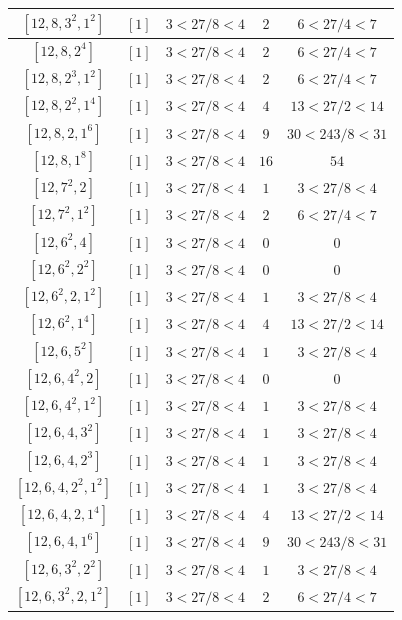 \documentclass{article}%
\begin{document}
\begin{center}
\begin{longtable}{||c|c|c|c|c||}
$[12, 8, 3^{2}, 1^{2}]$ & $[1]$ & $3 < 27/8 < 4$ & $2$ & $6 < 27/4 < 7$ \\ \hline 
$[12, 8, 2^{4}]$ & $[1]$ & $3 < 27/8 < 4$ & $2$ & $6 < 27/4 < 7$ \\ \hline 
$[12, 8, 2^{3}, 1^{2}]$ & $[1]$ & $3 < 27/8 < 4$ & $2$ & $6 < 27/4 < 7$ \\ \hline 
$[12, 8, 2^{2}, 1^{4}]$ & $[1]$ & $3 < 27/8 < 4$ & $4$ & $13 < 27/2 < 14$ \\ \hline 
$[12, 8, 2, 1^{6}]$ & $[1]$ & $3 < 27/8 < 4$ & $9$ & $30 < 243/8 < 31$ \\ \hline 
$[12, 8, 1^{8}]$ & $[1]$ & $3 < 27/8 < 4$ & $16$ & $54$ \\ \hline 
$[12, 7^{2}, 2]$ & $[1]$ & $3 < 27/8 < 4$ & $1$ & $3 < 27/8 < 4$ \\ \hline 
$[12, 7^{2}, 1^{2}]$ & $[1]$ & $3 < 27/8 < 4$ & $2$ & $6 < 27/4 < 7$ \\ \hline 
$[12, 6^{2}, 4]$ & $[1]$ & $3 < 27/8 < 4$ & $0$ & $0$ \\ \hline 
$[12, 6^{2}, 2^{2}]$ & $[1]$ & $3 < 27/8 < 4$ & $0$ & $0$ \\ \hline 
$[12, 6^{2}, 2, 1^{2}]$ & $[1]$ & $3 < 27/8 < 4$ & $1$ & $3 < 27/8 < 4$ \\ \hline 
$[12, 6^{2}, 1^{4}]$ & $[1]$ & $3 < 27/8 < 4$ & $4$ & $13 < 27/2 < 14$ \\ \hline 
$[12, 6, 5^{2}]$ & $[1]$ & $3 < 27/8 < 4$ & $1$ & $3 < 27/8 < 4$ \\ \hline 
$[12, 6, 4^{2}, 2]$ & $[1]$ & $3 < 27/8 < 4$ & $0$ & $0$ \\ \hline 
$[12, 6, 4^{2}, 1^{2}]$ & $[1]$ & $3 < 27/8 < 4$ & $1$ & $3 < 27/8 < 4$ \\ \hline 
$[12, 6, 4, 3^{2}]$ & $[1]$ & $3 < 27/8 < 4$ & $1$ & $3 < 27/8 < 4$ \\ \hline 
$[12, 6, 4, 2^{3}]$ & $[1]$ & $3 < 27/8 < 4$ & $1$ & $3 < 27/8 < 4$ \\ \hline 
$[12, 6, 4, 2^{2}, 1^{2}]$ & $[1]$ & $3 < 27/8 < 4$ & $1$ & $3 < 27/8 < 4$ \\ \hline 
$[12, 6, 4, 2, 1^{4}]$ & $[1]$ & $3 < 27/8 < 4$ & $4$ & $13 < 27/2 < 14$ \\ \hline 
$[12, 6, 4, 1^{6}]$ & $[1]$ & $3 < 27/8 < 4$ & $9$ & $30 < 243/8 < 31$ \\ \hline 
$[12, 6, 3^{2}, 2^{2}]$ & $[1]$ & $3 < 27/8 < 4$ & $1$ & $3 < 27/8 < 4$ \\ \hline 
$[12, 6, 3^{2}, 2, 1^{2}]$ & $[1]$ & $3 < 27/8 < 4$ & $2$ & $6 < 27/4 < 7$ \\ \hline 

\end{longtable}
\end{center}
\end{document}
